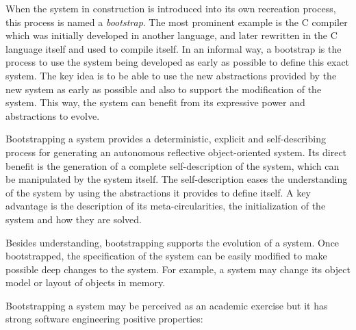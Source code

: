 When the system in construction is introduced into its own recreation process, this process is named a \emph{bootstrap}. The most prominent example is the C compiler which was initially developed in another language, and later rewritten in the C language itself and used to compile itself.  In an informal way, a bootstrap is the process to use the system being developed as early as possible to define this exact system. The key idea is to be able to use the new abstractions provided by the new system as early as possible and also to support the modification of the system. This way, the system can benefit from its expressive power and abstractions to evolve.

Bootstrapping a system provides a deterministic, explicit and self-describing process for generating an autonomous reflective object-oriented system. Its direct benefit is the generation of a complete self-description of the system, which can be manipulated by the system itself.
The self-description eases the understanding of the system by using the abstractions it provides to define itself. A key advantage is the description of its meta-circularities, the initialization of the system and how they are solved.

Besides understanding, bootstrapping supports the evolution of a system. Once bootstrapped, the specification of the system can be easily modified to make possible deep changes to the system.
For example, a system may change its object model or layout of objects in memory.

Bootstrapping a system may be perceived as an academic exercise but it has strong software engineering positive properties: 

